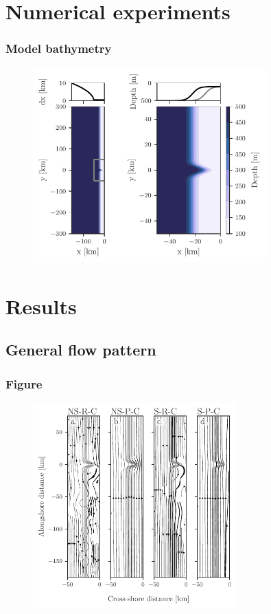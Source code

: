 \documentclass{beamer}
\begin{document}
\section{Numerical experiments}
\begin{frame}
\frametitle{Model bathymetry}
\begin{figure}
\centering
\includegraphics[clip, trim=0 0 0 0.3cm, width=0.8\textwidth]{figures/bathymetry.pdf}
\end{figure}
\end{frame}

\section{Results}

\subsection{General flow pattern}
\begin{frame}
\frametitle{Figure}
\begin{figure}
\centering
\includegraphics[width=0.7\textwidth]{figures/mean_streamlines_canyon_z95_40-50.pdf}
\end{figure}
\end{frame}
\end{document}
